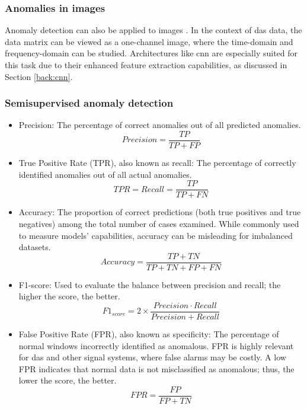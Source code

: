 \subsubsection{Anomalies in images}

Anomaly detection can also be applied to images \cite{beggel2020robust}. In the context of \acrshort{das} data, the data matrix can be viewed as a one-channel image, where the time-domain and frequency-domain can be studied. Architectures like \acrshort{cnn} are especially suited for this task due to their enhanced feature extraction capabilities, as discussed in Section \ref{back:cnn}.


\subsubsection{Semisupervised anomaly detection}
\begin{itemize}
    \item Precision: The percentage of correct anomalies out of all predicted anomalies.
    \begin{equation}
        Precision = \frac{TP}{TP + FP}
    \end{equation}

    \item True Positive Rate (TPR), also known as recall: The percentage of correctly identified anomalies out of all actual anomalies.
    \begin{equation}
        TPR = Recall = \frac{TP}{TP + FN}
    \end{equation}

    \item Accuracy: The proportion of correct predictions (both true positives and true negatives) among the total number of cases examined. While commonly used to measure models' capabilities, accuracy can be misleading for imbalanced datasets.
    \begin{equation}
        Accuracy = \frac{TP + TN}{TP + TN + FP + FN}
    \end{equation}

    \item F1-score: Used to evaluate the balance between precision and recall; the higher the score, the better. 
    \begin{equation}
        F1_{score} = 2 \times \frac{Precision \cdot Recall}{Precision + Recall}
    \end{equation}

    \item False Positive Rate (FPR), also known as specificity: The percentage of normal windows incorrectly identified as anomalous. FPR is highly relevant for \acrshort{das} and other signal systems, where false alarms may be costly. A low FPR indicates that normal data is not misclassified as anomalous; thus, the lower the score, the better.
    \begin{equation}
        FPR = \frac{FP}{FP + TN}
    \end{equation}
\end{itemize}

